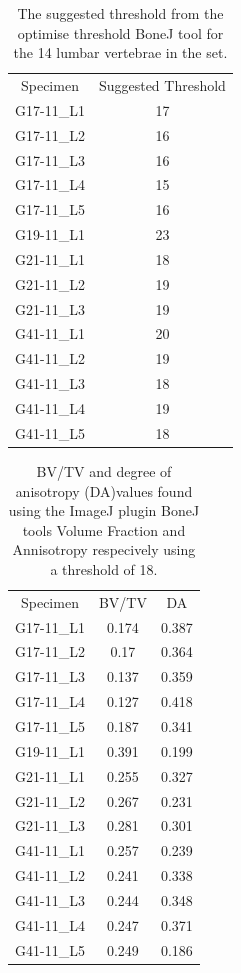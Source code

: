 \begin{table}[ht!]
	\caption{The suggested threshold from the optimise threshold BoneJ tool for
    the 14 lumbar vertebrae in the set.}
	\label{tab:th_bv_tv}
	\centering
	\begin{tabular}{c|c}
    Specimen    & Suggested Threshold   \\
G17-11\_L1 & 17 \\
G17-11\_L2 & 16\\
G17-11\_L3 & 16\\
G17-11\_L4 & 15\\
G17-11\_L5 & 16\\
G19-11\_L1 & 23\\
G21-11\_L1 & 18\\
G21-11\_L2 & 19\\
G21-11\_L3 & 19\\
G41-11\_L1 & 20\\
G41-11\_L2 & 19\\
G41-11\_L3 & 18\\
G41-11\_L4 & 19\\
G41-11\_L5 & 18\\
	\hline
	\end{tabular}
\end{table}

\begin{table}[ht!]
	\caption{BV/TV and degree of anisotropy (DA)values found using the ImageJ
    plugin BoneJ tools Volume Fraction and Annisotropy respecively using a
    threshold of 18.}
	\label{tab:th_bv_tv}
	\centering
	\begin{tabular}{c|c|c}
    Specimen                       & BV/TV & DA\\
G17-11\_L1  & 0.174 & 0.387 \\
G17-11\_L2  & 0.17  & 0.364\\
G17-11\_L3  & 0.137 & 0.359\\
G17-11\_L4  & 0.127 & 0.418\\
G17-11\_L5  & 0.187 & 0.341\\
G19-11\_L1  & 0.391 & 0.199\\
G21-11\_L1  & 0.255 & 0.327\\
G21-11\_L2  & 0.267 & 0.231\\
G21-11\_L3  & 0.281 & 0.301\\
G41-11\_L1  & 0.257 & 0.239\\
G41-11\_L2  & 0.241 & 0.338\\
G41-11\_L3  & 0.244 & 0.348\\
G41-11\_L4  & 0.247 & 0.371\\
G41-11\_L5  & 0.249 & 0.186\\
	\hline
	\end{tabular}
\end{table}

